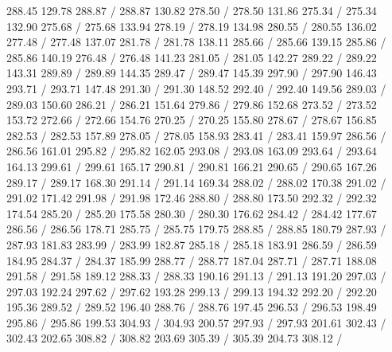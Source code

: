{ 288.45 129.78 288.87 /
 288.87 130.82 278.50 /
 278.50 131.86 275.34 /
 275.34 132.90 275.68 /
 275.68 133.94 278.19 /
 278.19 134.98 280.55 /
 280.55 136.02 277.48 /
 277.48 137.07 281.78 /
 281.78 138.11 285.66 /
 285.66 139.15 285.86 /
 285.86 140.19 276.48 /
 276.48 141.23 281.05 /
 281.05 142.27 289.22 /
 289.22 143.31 289.89 /
 289.89 144.35 289.47 /
 289.47 145.39 297.90 /
 297.90 146.43 293.71 /
 293.71 147.48 291.30 /
 291.30 148.52 292.40 /
 292.40 149.56 289.03 /
 289.03 150.60 286.21 /
 286.21 151.64 279.86 /
 279.86 152.68 273.52 /
 273.52 153.72 272.66 /
 272.66 154.76 270.25 /
 270.25 155.80 278.67 /
 278.67 156.85 282.53 /
 282.53 157.89 278.05 /
 278.05 158.93 283.41 /
 283.41 159.97 286.56 /
 286.56 161.01 295.82 /
 295.82 162.05 293.08 /
 293.08 163.09 293.64 /
 293.64 164.13 299.61 /
 299.61 165.17 290.81 /
 290.81 166.21 290.65 /
 290.65 167.26 289.17 /
 289.17 168.30 291.14 /
 291.14 169.34 288.02 /
 288.02 170.38 291.02 /
 291.02 171.42 291.98 /
 291.98 172.46 288.80 /
 288.80 173.50 292.32 /
 292.32 174.54 285.20 /
 285.20 175.58 280.30 /
 280.30 176.62 284.42 /
 284.42 177.67 286.56 /
 286.56 178.71 285.75 /
 285.75 179.75 288.85 /
 288.85 180.79 287.93 /
 287.93 181.83 283.99 /
 283.99 182.87 285.18 /
 285.18 183.91 286.59 /
 286.59 184.95 284.37 /
 284.37 185.99 288.77 /
 288.77 187.04 287.71 /
 287.71 188.08 291.58 /
 291.58 189.12 288.33 /
 288.33 190.16 291.13 /
 291.13 191.20 297.03 /
 297.03 192.24 297.62 /
 297.62 193.28 299.13 /
 299.13 194.32 292.20 /
 292.20 195.36 289.52 /
 289.52 196.40 288.76 /
 288.76 197.45 296.53 /
 296.53 198.49 295.86 /
 295.86 199.53 304.93 /
 304.93 200.57 297.93 /
 297.93 201.61 302.43 /
 302.43 202.65 308.82 /
 308.82 203.69 305.39 /
 305.39 204.73 308.12 /
}
